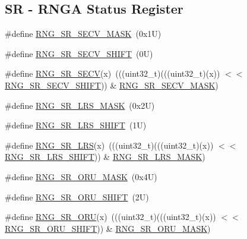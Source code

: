 \subsection*{SR -\/ R\+N\+GA Status Register}
\begin{DoxyCompactItemize}
\item 
\#define \mbox{\hyperlink{group___r_n_g___register___masks_ga7fde61b3578eb7d529405f7090a36e28}{R\+N\+G\+\_\+\+S\+R\+\_\+\+S\+E\+C\+V\+\_\+\+M\+A\+SK}}~(0x1\+U)
\item 
\#define \mbox{\hyperlink{group___r_n_g___register___masks_gad37b495266223189729bdaa62c9deb5f}{R\+N\+G\+\_\+\+S\+R\+\_\+\+S\+E\+C\+V\+\_\+\+S\+H\+I\+FT}}~(0\+U)
\item 
\#define \mbox{\hyperlink{group___r_n_g___register___masks_gad4572970c029ce5f45f9f71d3e259790}{R\+N\+G\+\_\+\+S\+R\+\_\+\+S\+E\+CV}}(x)~(((uint32\+\_\+t)(((uint32\+\_\+t)(x)) $<$$<$ \mbox{\hyperlink{group___r_n_g___register___masks_gad37b495266223189729bdaa62c9deb5f}{R\+N\+G\+\_\+\+S\+R\+\_\+\+S\+E\+C\+V\+\_\+\+S\+H\+I\+FT}})) \& \mbox{\hyperlink{group___r_n_g___register___masks_ga7fde61b3578eb7d529405f7090a36e28}{R\+N\+G\+\_\+\+S\+R\+\_\+\+S\+E\+C\+V\+\_\+\+M\+A\+SK}})
\item 
\#define \mbox{\hyperlink{group___r_n_g___register___masks_gacba2db7d02686b0737b4b47ba765d063}{R\+N\+G\+\_\+\+S\+R\+\_\+\+L\+R\+S\+\_\+\+M\+A\+SK}}~(0x2\+U)
\item 
\#define \mbox{\hyperlink{group___r_n_g___register___masks_ga13e9b834adced475b1d075eb159655fd}{R\+N\+G\+\_\+\+S\+R\+\_\+\+L\+R\+S\+\_\+\+S\+H\+I\+FT}}~(1\+U)
\item 
\#define \mbox{\hyperlink{group___r_n_g___register___masks_ga4b718e1de32f8695910d76d593bf200e}{R\+N\+G\+\_\+\+S\+R\+\_\+\+L\+RS}}(x)~(((uint32\+\_\+t)(((uint32\+\_\+t)(x)) $<$$<$ \mbox{\hyperlink{group___r_n_g___register___masks_ga13e9b834adced475b1d075eb159655fd}{R\+N\+G\+\_\+\+S\+R\+\_\+\+L\+R\+S\+\_\+\+S\+H\+I\+FT}})) \& \mbox{\hyperlink{group___r_n_g___register___masks_gacba2db7d02686b0737b4b47ba765d063}{R\+N\+G\+\_\+\+S\+R\+\_\+\+L\+R\+S\+\_\+\+M\+A\+SK}})
\item 
\#define \mbox{\hyperlink{group___r_n_g___register___masks_ga3584aefed1802fa0dc97f56ee7ceb292}{R\+N\+G\+\_\+\+S\+R\+\_\+\+O\+R\+U\+\_\+\+M\+A\+SK}}~(0x4\+U)
\item 
\#define \mbox{\hyperlink{group___r_n_g___register___masks_ga6b0320c0b7ca685c61880f0240959cc8}{R\+N\+G\+\_\+\+S\+R\+\_\+\+O\+R\+U\+\_\+\+S\+H\+I\+FT}}~(2\+U)
\item 
\#define \mbox{\hyperlink{group___r_n_g___register___masks_gaf467e3533c442a735c1742474cf4dffc}{R\+N\+G\+\_\+\+S\+R\+\_\+\+O\+RU}}(x)~(((uint32\+\_\+t)(((uint32\+\_\+t)(x)) $<$$<$ \mbox{\hyperlink{group___r_n_g___register___masks_ga6b0320c0b7ca685c61880f0240959cc8}{R\+N\+G\+\_\+\+S\+R\+\_\+\+O\+R\+U\+\_\+\+S\+H\+I\+FT}})) \& \mbox{\hyperlink{group___r_n_g___register___masks_ga3584aefed1802fa0dc97f56ee7ceb292}{R\+N\+G\+\_\+\+S\+R\+\_\+\+O\+R\+U\+\_\+\+M\+A\+SK}})
$$
\end{DoxyCompactItemize}

